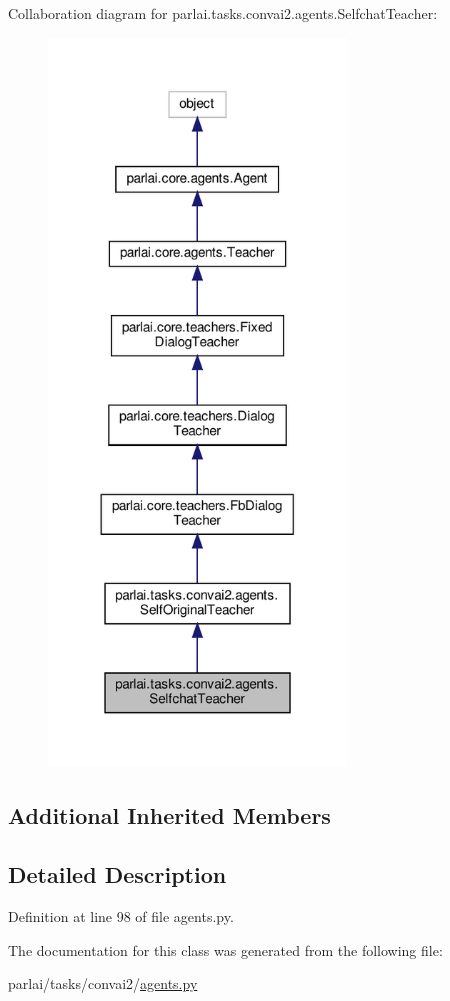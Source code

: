 Collaboration diagram for parlai.\+tasks.\+convai2.\+agents.\+Selfchat\+Teacher\+:
\nopagebreak
\begin{figure}[H]
\begin{center}
\leavevmode
\includegraphics[width=224pt]{d4/d2c/classparlai_1_1tasks_1_1convai2_1_1agents_1_1SelfchatTeacher__coll__graph}
\end{center}
\end{figure}
\subsection*{Additional Inherited Members}


\subsection{Detailed Description}


Definition at line 98 of file agents.\+py.



The documentation for this class was generated from the following file\+:\begin{DoxyCompactItemize}
\item 
parlai/tasks/convai2/\hyperlink{parlai_2tasks_2convai2_2agents_8py}{agents.\+py}\end{DoxyCompactItemize}
